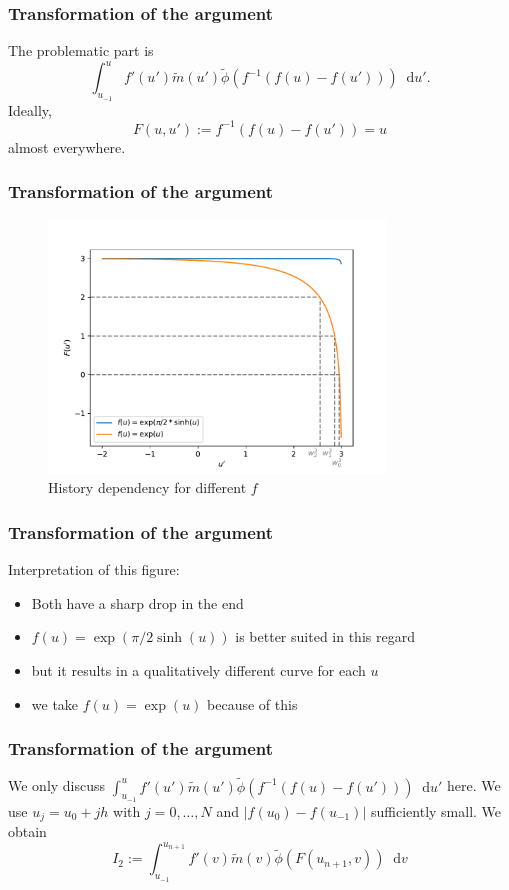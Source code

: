 \documentclass[12pt,a4paper,handout]{beamer}
\theoremstyle{definition}
\theoremstyle{plain}
\newcommand{\abs}[1]{\left\vert #1\right\vert}
\newcommand{\D}{\mathop{}\!\mathrm{d}}
\begin{document}
\begin{frame}
    \frametitle{Transformation of the argument}
    The problematic part is
    \begin{equation*}
        \int_{u_{-1}}^{u}f'(u')\tilde{m}(u')\tilde{\phi}(f^{-1}(f(u)-f(u')))\D u'.
    \end{equation*}
    Ideally,
    \begin{equation*}
        F(u,u'):=f^{-1}(f(u)-f(u'))=u
    \end{equation*}
    almost everywhere.
\end{frame}
\begin{frame}
    \frametitle{Transformation of the argument}
    \begin{figure}
        \centering
        \includegraphics[width=0.8\textwidth]{HistoryF}
        \caption{History dependency for different $f$}
    \end{figure}
\end{frame}
\begin{frame}
    \frametitle{Transformation of the argument}
    Interpretation of this figure:
    \begin{itemize}[<+->]
        \item Both have a sharp drop in the end
        \item $f(u)=\exp(\pi/2\sinh(u))$ is better suited in this regard
        \item but it results in a qualitatively different curve for each $u$
        \item we take $f(u)=\exp(u)$ because of this 
    \end{itemize}
\end{frame}
\begin{frame}
    \frametitle{Transformation of the argument}
    We only discuss $\int_{u_{-1}}^{u}f'(u')\tilde{m}(u')\tilde{\phi}(f^{-1}(f(u)-f(u')))\D u'$ here. We use $u_j=u_0+jh$ with $j=0,\dotsc,N$ and $\abs{f(u_0)-f(u_{-1})}$ sufficiently small. We obtain
    \begin{equation*}
        I_2:=\int_{u_{-1}}^{u_{n+1}}f'(v)\tilde{m}(v)\tilde{\phi}(F(u_{n+1},v))\D v
    \end{equation*}
\end{frame}
\end{document}
